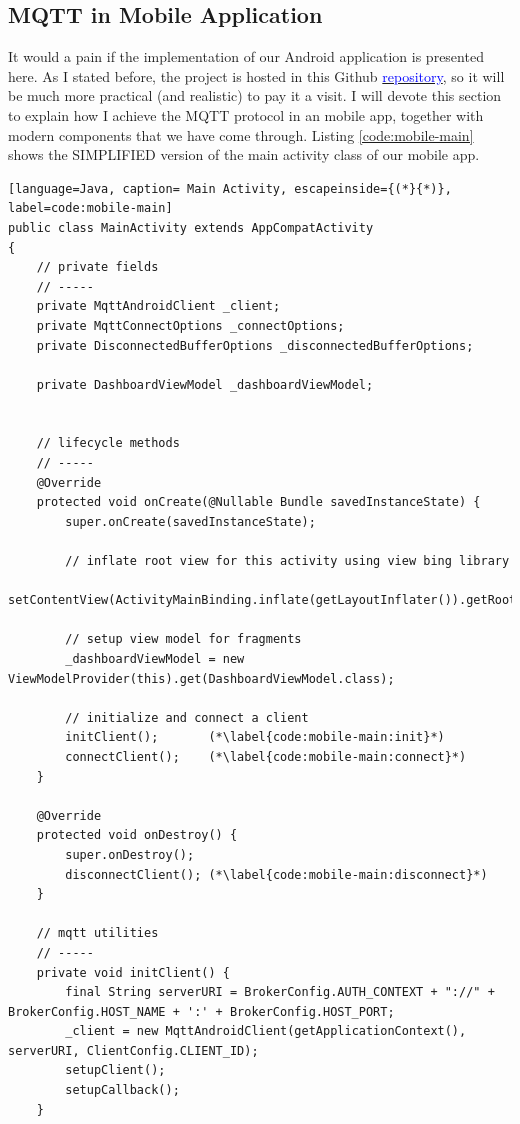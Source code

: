 \subsection{MQTT in Mobile Application}
It would a pain if the implementation of our Android application is presented here. As I stated before, the project is hosted in this Github \href{https://github.com/hescul/adafruit-simple-iot}{\textcolor{blue}{repository}}, so it will be much more practical (and realistic) to pay it a visit. I will devote this section to explain how I achieve the MQTT protocol in an mobile app, together with modern components that we have come through. Listing \ref{code:mobile-main} shows the SIMPLIFIED version of the main activity class of our mobile app.
\begin{lstlisting}[language=Java, caption= Main Activity, escapeinside={(*}{*)}, label=code:mobile-main]
public class MainActivity extends AppCompatActivity
{
    // private fields
    // -----
    private MqttAndroidClient _client;
    private MqttConnectOptions _connectOptions;
    private DisconnectedBufferOptions _disconnectedBufferOptions;

    private DashboardViewModel _dashboardViewModel;


    // lifecycle methods
    // -----
    @Override
    protected void onCreate(@Nullable Bundle savedInstanceState) {
        super.onCreate(savedInstanceState);

        // inflate root view for this activity using view bing library
        setContentView(ActivityMainBinding.inflate(getLayoutInflater()).getRoot());

        // setup view model for fragments
        _dashboardViewModel = new ViewModelProvider(this).get(DashboardViewModel.class);

        // initialize and connect a client
        initClient();       (*\label{code:mobile-main:init}*)
        connectClient();    (*\label{code:mobile-main:connect}*)
    }

    @Override
    protected void onDestroy() {
        super.onDestroy();
        disconnectClient(); (*\label{code:mobile-main:disconnect}*)
    }

    // mqtt utilities
    // -----
    private void initClient() {
        final String serverURI = BrokerConfig.AUTH_CONTEXT + "://" + BrokerConfig.HOST_NAME + ':' + BrokerConfig.HOST_PORT;
        _client = new MqttAndroidClient(getApplicationContext(), serverURI, ClientConfig.CLIENT_ID);
        setupClient();
        setupCallback();
    }


\end{lstlisting}
